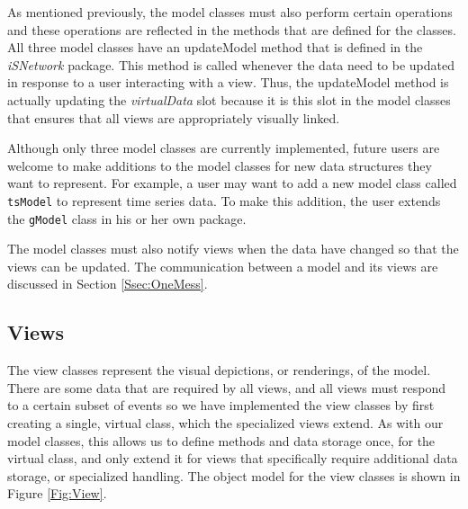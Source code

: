 \documentclass{article}[11pt]
\newcommand{\Rfunction}[1]{{\textsf{#1}}}
\newcommand{\Rpackage}[1]{{\textit{#1}}}
\newcommand{\Rslot}[1]{\textsl{#1}}
\newcommand{\Rclass}[1]{\texttt{#1}}
\begin{document}
As mentioned previously, the model classes must also perform certain
operations and these operations are reflected in the methods that are defined
for the classes.  All three model classes have an \Rfunction{updateModel}
method that is defined in the \Rpackage{iSNetwork} package.  This method is
called whenever the data need to be updated in response to a user interacting
with a view.  Thus, the \Rfunction{updateModel} method is actually updating the
\Rslot{virtualData} slot because it is this slot in the model classes
that ensures that all views are appropriately visually linked.  

Although only three model classes are currently implemented, future
users are welcome to make additions to the model classes for new data
structures they want to represent.  For example, a user may want to add a new
model class called \Rclass{tsModel} to represent time series data.
To make this addition, the user extends the \Rclass{gModel} class in his or
her own package. 

The model classes must also notify views when the data have changed
so that the views can be updated.  The communication between a model and its
views are discussed in Section \ref{Ssec:OneMess}. 

\subsection{Views}
\label{Ssec:OneViews}

The view classes represent the visual depictions, or renderings, of
the model.  There are some data that are required by all views, and all views
must respond to a certain subset of events so we have implemented the view
classes by first creating a single, virtual class, which the specialized
views extend.  As with our model classes, this allows us to define
methods and data storage once, for the virtual class, and only extend
it for views that specifically require additional data storage, or
specialized handling.  The object model for the view classes is shown
in Figure \ref{Fig:View}.
\end{document}
